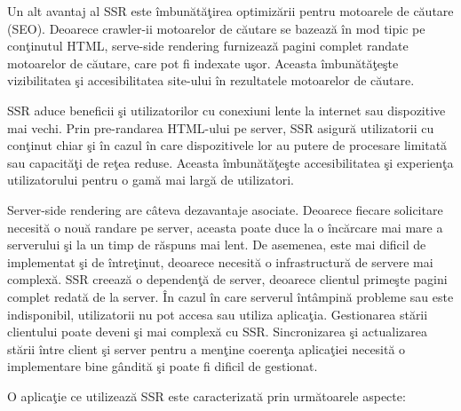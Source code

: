 \documentclass[12pt, a4paper]{report}
\begin{document}

Un alt avantaj al SSR este \^imbun\u at\u a\c tirea optimiz\u arii pentru motoarele de c\u autare (SEO). Deoarece crawler-ii motoarelor de c\u autare se bazeaz\u a \^in mod tipic pe con\c tinutul HTML, serve-side rendering furnizeaz\u a pagini complet randate motoarelor de c\u autare, care pot fi indexate u\c sor. Aceasta \^imbun\u at\u a\c te\c ste vizibilitatea \c si accesibilitatea site-ului \^in rezultatele motoarelor de c\u autare.

SSR aduce beneficii \c si utilizatorilor cu conexiuni lente la internet sau dispozitive mai vechi. Prin pre-randarea HTML-ului pe server, SSR asigur\u a utilizatorii cu con\c tinut chiar \c si \^in cazul \^in care dispozitivele lor au putere de procesare limitat\u a sau capacit\u a\c ti de re\c tea reduse. Aceasta \^imbun\u at\u a\c te\c ste accesibilitatea \c si experien\c ta utilizatorului pentru o gam\u a mai larg\u a de utilizatori.

Server-side rendering are c\^ateva dezavantaje asociate. Deoarece fiecare solicitare necesit\u a o nou\u a randare pe server, aceasta poate duce la o \^inc\u arcare mai mare a serverului \c si la un timp de r\u aspuns mai lent. De asemenea, este mai dificil de implementat \c si de \^intre\c tinut, deoarece necesit\u a o infrastructur\u a de servere mai complex\u a. SSR creeaz\u a o dependen\c t\u a de server, deoarece clientul prime\c ste pagini complet redat\u a de la server. \^In cazul \^in care serverul \^int\^ampin\u a probleme sau este indisponibil, utilizatorii nu pot accesa sau utiliza aplica\c tia.
Gestionarea st\u arii clientului poate deveni \c si mai complex\u a cu SSR. Sincronizarea \c si actualizarea st\u arii \^intre client \c si server pentru a men\c tine coeren\c ta aplica\c tiei necesit\u a o implementare bine g\^andit\u a \c si poate fi dificil de gestionat.

O aplica\c tie ce utilizeaz\u a SSR este caracterizat\u a prin urm\u atoarele aspecte:
\end{document}
